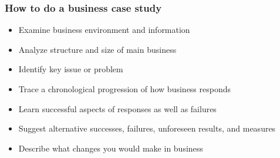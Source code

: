 \documentclass[10pt,handout,notes=show]{beamer}
\begin{document}
\begin{frame}
  \frametitle{How to do a business case study}

  \begin{itemize}
    \item[1] Examine \alert{business environment} and \alert{information}
    \item[2] Analyze structure and size of \alert{main business}
    \item[3] Identify key issue or problem
    \item[4] Trace a chronological progression of how business responds
    \item[5] Learn successful aspects of responses as well as failures
    \item[6] \alert{Suggest alternative} successes, failures, unforeseen results, and measures
    \item[7] Describe \alert{what changes you would make} in business
  \end{itemize}



\end{frame}



\end{document}
